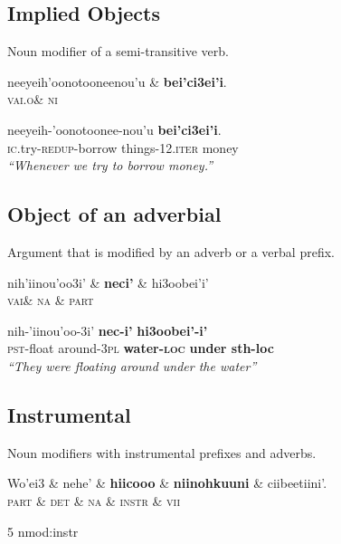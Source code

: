 \documentclass{handout}
\begin{document}
\begin{multicols}{2}
\subsection{Implied Objects}
\footnotesize
\begin{exe}
\ex \label{nmod:objim} Noun modifier of a semi-transitive verb. \\%
\begin{dependency}
\begin{deptext}
neeyeih'oonotooneenou'u \& \textbf{bei'ci3ei'i}.\\
\textsc{vai.o}\& \textsc{ni}\\
\end{deptext}
\end{dependency}
\gll neeyeih-'oonotoonee-nou'u \textbf{bei'ci3ei'i}.\\
{\textsc{ic}.try-\textsc{redup}-borrow things-12.\textsc{iter}} money\\
\trans \textit{``Whenever we try to borrow money.''}
\end{exe}
\subsection{Object of an adverbial}
\footnotesize
\begin{exe}
\ex \label{objad} Argument that is modified by an adverb or a verbal prefix.\\
\begin{dependency}
\begin{deptext}
nih'iinou'oo3i' \& \textbf{neci'} \& hi3oobei'i'\\
\textsc{vai}\& \textsc{na} \& \textsc{part}\\
\end{deptext}
\end{dependency}
\gll nih-'iinou'oo-3i' \textbf{nec-i'} \textbf{hi3oobei'-i'}\\
{\textsc{pst}-float around-\textsc{3pl}} \textbf{water-\textsc{loc}} \textbf{{under sth-loc}}\\
\trans \textit{``They were floating around under the water''}
\end{exe}
\subsection{Instrumental}
\footnotesize
\begin{exe}
\ex \label{instrument} Noun modifiers with instrumental prefixes and adverbs.\\ %
\begin{dependency}
\begin{deptext}
Wo'ei3 \& nehe' \& \textbf{hiicooo} \& \textbf{niinohkuuni} \& ciibeetiini'.\\
\textsc{part} \& \textsc{det} \& \textsc{na} \& \textsc{instr} \& \textsc{vii}\\
\end{deptext}
	{5}	{nmod:instr}


\end{dependency}
\end{exe}
\end{multicols}
\end{document}
